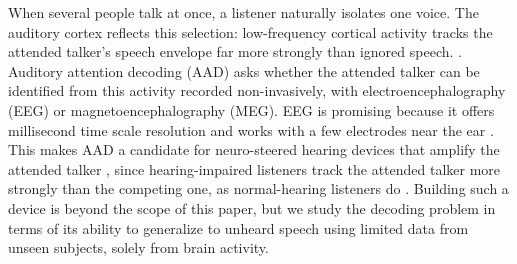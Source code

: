 \documentclass[twoside]{article}
\begin{document}
When several people talk at once, a listener naturally isolates one voice. The auditory cortex reflects this selection: low-frequency cortical activity tracks the attended talker's speech envelope far more strongly than ignored speech.
\citep{ding2012emergence,mesgarani2012selective,osullivan2015attentional}. Auditory
attention decoding (AAD) asks whether the attended talker can be identified from this
activity recorded non-invasively, with electroencephalography (EEG) or magnetoencephalography
(MEG). %
EEG is promising because it offers millisecond time scale resolution and works with a few electrodes near the ear \citep{mirkovic2015decoding,fiedler2017single}. This makes AAD a
candidate for neuro-steered hearing devices that amplify the attended talker
\citep{geirnaert2021eeg}, since hearing-impaired
listeners track the attended talker more strongly than the competing one, as normal-hearing
listeners do \citep{petersen2017neural,decruy2020hearing,fuglsang2020effects}. Building such a device is
beyond the scope of this paper, but we study the decoding problem in terms of its ability to generalize to unheard speech using limited data from unseen subjects, solely from brain activity. 
\end{document}
